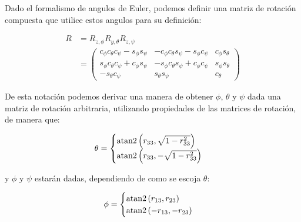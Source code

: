\begin{multicols*}{3}
            Dado el formalismo de angulos de Euler, podemos definir una matriz de rotación compuesta que utilice estos angulos para su definición:

            \begin{align}
                R &= R_{z, \phi} R_{y, \theta} R_{z, \psi} \nonumber \\
                &=
                \begin{pmatrix}
                    c_{\phi} c_{\theta} c_{\psi} - s_{\phi} s_{\psi} & - c_{\phi} c_{\theta} s_{\psi} - s_{\phi} c_{\psi} & c_{\phi} s_{\theta} \\
                    s_{\phi} c_{\theta} c_{\psi} + c_{\phi} s_{\psi} & - s_{\phi} c_{\theta} s_{\psi} + c_{\phi} c_{\psi} & s_{\phi} s_{\theta} \\
                    - s_{\theta} c_{\psi} & s_{\theta} s_{\psi} & c_{\theta}
                \end{pmatrix}
            \end{align}

            \begin{center}
            \end{center}

            De esta notación podemos derivar una manera de obtener $\phi$, $\theta$ y $\psi$ dada una matriz de rotación arbitraria, utilizando propiedades de las matrices de rotación, de manera que:

            \begin{equation}
                \theta =
                \begin{cases}
                    \operatorname{atan2}{\left( r_{33}, \sqrt{1 - r_{33}^2} \right)} \\
                    \operatorname{atan2}{\left( r_{33}, -\sqrt{1 - r_{33}^2} \right)}
                \end{cases}
            \end{equation}

            y $\phi$ y $\psi$ estarán dadas, dependiendo de como se escoja $\theta$:

            \begin{equation}
                \phi =
                \begin{cases}
                    \operatorname{atan2}{(r_{13}, r_{23})} \\
                    \operatorname{atan2}{(-r_{13}, -r_{23})}
                \end{cases}
            \end{equation}


\end{multicols*}
